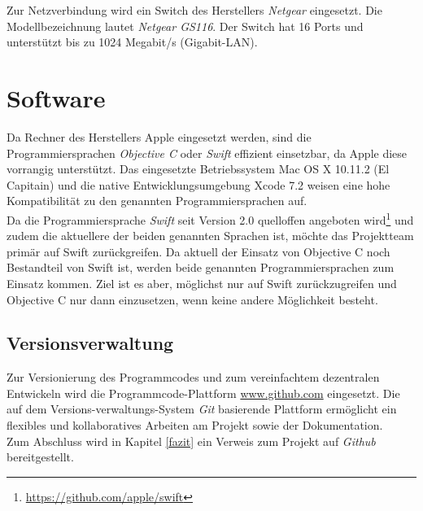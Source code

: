 Zur Netzverbindung wird ein Switch des Herstellers \emph{Netgear} eingesetzt. Die Modellbezeichnung lautet \emph{Netgear GS116}. Der Switch hat 16 Ports und unterstützt bis zu 1024 Megabit/s (Gigabit-LAN).

\section{Software}
\label{softwarebasis}
Da Rechner des Herstellers Apple eingesetzt werden, sind die Programmiersprachen \emph{Objective C} oder \emph{Swift} effizient einsetzbar, da Apple diese vorrangig unterstützt. Das eingesetzte Betriebssystem Mac OS X 10.11.2 (El Capitain) und die native Entwicklungsumgebung Xcode 7.2 weisen eine hohe Kompatibilität zu den genannten Programmiersprachen auf. \\
Da die Programmiersprache \emph{Swift} seit Version 2.0 quelloffen angeboten wird\footnote{\url{https://github.com/apple/swift}} und zudem die aktuellere der beiden genannten Sprachen ist, möchte das Projektteam primär auf Swift zurückgreifen. Da aktuell der Einsatz von Objective C noch Bestandteil von Swift ist, werden beide genannten Programmiersprachen zum Einsatz kommen. Ziel ist es aber, möglichst nur auf Swift zurückzugreifen und Objective C nur dann einzusetzen, wenn keine andere Möglichkeit besteht. \\
\subsection{Versionsverwaltung}
Zur Versionierung des Programmcodes und zum vereinfachtem dezentralen Entwickeln wird die Programmcode-Plattform \url{www.github.com} eingesetzt. Die auf dem Versions-verwaltungs-System \emph{Git} basierende Plattform ermöglicht ein flexibles und kollaboratives Arbeiten am Projekt sowie der Dokumentation. \\
Zum Abschluss wird in Kapitel \ref{fazit} ein Verweis zum Projekt auf \emph{Github} bereitgestellt. 

